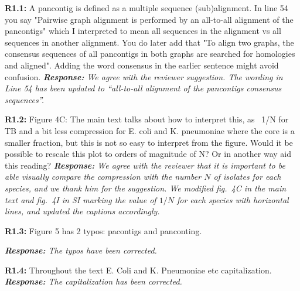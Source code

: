 \documentclass[aps,rmp,onecolumn]{revtex4-1}
\newcommand{\Marco}[1]{{\color{gray}Marco: #1}}
\newcommand{\Liam}[1]{{\color{teal}Liam: #1}}
\newcommand{\reviewer}[2]{\textbf{#1:} #2\vskip 5mm}
\newcommand{\response}[1]{{\it {\color{response}\textbf{Response:} #1}}\vskip 5mm}
\begin{document}
\reviewer{R1.1}{A pancontig is defined as a multiple sequence (sub)alignment. In line 54 you say "Pairwise graph alignment is performed by an all-to-all alignment of the pancontigs" which I interpreted to mean all sequences in the alignment vs all sequences in another alignment. You do later add that "To align two graphs, the consensus sequences of all pancontigs in both graphs are searched for homologies and aligned". Adding the word consensus in the earlier sentence might avoid confusion.}
\response{We agree with the reviewer suggestion. The wording in Line 54 has been updated to ``all-to-all alignment of the \textit{pancontigs} consensus sequences''.}

\reviewer{R1.2}{Figure 4C: The main text talks about how to interpret this, as ~1/N for TB and a bit less compression for E. coli and K. pneumoniae where the core is a smaller fraction, but this is not so easy to interpret from the figure. Would it be possible to rescale this plot to orders of magnitude of N? Or in another way aid this reading?}
\response{We agree with the reviewer that it is important to be able visually compare the compression with the number $N$ of isolates for each species, and we thank him for the suggestion. We modified fig.~4C in the main text and fig.~4I in SI marking the value of $1/N$ for each species with horizontal lines, and updated the captions accordingly.}

\reviewer{R1.3}{Figure 5 has 2 typos: pacontigs and panconting.}

\response{The typos have been corrected.}

\reviewer{R1.4}{Throughout the text E. Coli and K. Pneumoniae etc capitalization.}
\response{The capitalization has been corrected.}
\end{document}

